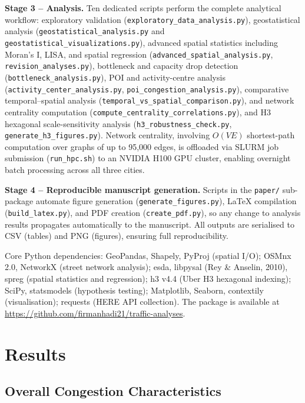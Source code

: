 \documentclass[12pt,a4paper]{article}
\begin{document}
\textbf{Stage 3 -- Analysis.} Ten dedicated scripts perform the complete analytical workflow: exploratory validation  (\texttt{exploratory\_data\_analysis.py}), geostatistical analysis (\texttt{geostatistical\_analysis.py} and \texttt{geostatistical\_visualizations.py}), advanced spatial statistics including Moran's I, LISA, and spatial regression (\texttt{advanced\_spatial\_analysis.py}, \texttt{revision\_analyses.py}), bottleneck and capacity drop detection (\texttt{bottleneck\_analysis.py}), POI and activity-centre analysis (\texttt{activity\_center\_analysis.py}, \texttt{poi\_congestion\_analysis.py}), comparative temporal--spatial analysis (\texttt{temporal\_vs\_spatial\_comparison.py}), and network centrality computation (\texttt{compute\_centrality\_correlations.py}), and H3 hexagonal scale-sensitivity analysis (\texttt{h3\_robustness\_check.py}, \texttt{generate\_h3\_figures.py}). Network centrality, involving $O(VE)$ shortest-path computation over graphs of up to 95,000 edges, is offloaded via SLURM job submission (\texttt{run\_hpc.sh}) to an NVIDIA H100 GPU cluster, enabling overnight batch processing across all three cities.

\textbf{Stage 4 -- Reproducible manuscript generation.} Scripts in the \texttt{paper/} sub-package automate figure generation (\texttt{generate\_figures.py}), LaTeX compilation (\texttt{build\_latex.py}), and PDF creation (\texttt{create\_pdf.py}), so any change to analysis results propagates automatically to the manuscript. All outputs are serialised to CSV (tables) and PNG (figures), ensuring full reproducibility.

Core Python dependencies: GeoPandas, Shapely, PyProj (spatial I/O); OSMnx 2.0, NetworkX (street network analysis); esda, libpysal (Rey \& Anselin, 2010), spreg (spatial statistics and regression); h3 v4.4 (Uber H3 hexagonal indexing); SciPy, statsmodels (hypothesis testing); Matplotlib, Seaborn, contextily (visualisation); requests (HERE API collection). The package is available at \url{https://github.com/firmanhadi21/traffic-analyses}.



\section{Results}

\subsection{Overall Congestion Characteristics}
\end{document}
